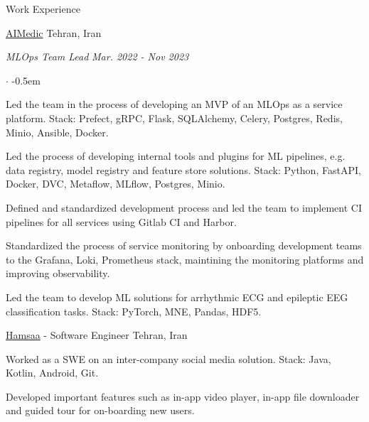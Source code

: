 \documentclass[../professional-cv.tex]{subfiles}
\begin{document}
\begin{rSection}{Work Experience}
	\begin{rWorkSection}
		{\href{https://aimedic.co/}{AIMedic}}
		{Tehran, Iran}

		\vspace{-1em}
		{\em MLOps Team Lead} \hfill {\em Mar. 2022 - Nov 2023} \hspace{10pt}
		\normalfont
		\begin{list}{$\cdot$}{\leftmargin=10pt\normalfont \rightmargin=20pt}
			\itemsep -0.5em
			\item Led the team in the process of developing an MVP of an MLOps as a service platform. Stack: Prefect, gRPC, Flask, SQLAlchemy, Celery, Postgres, Redis, Minio, Ansible, Docker.
			\item Led the process of developing internal tools and plugins for ML pipelines, e.g. data registry, model registry and feature store solutions. Stack: Python, FastAPI, Docker, DVC, Metaflow, MLflow, Postgres, Minio.
			\item Defined and standardized development process and led the team to implement CI pipelines for all services using Gitlab CI and Harbor.
			\item Standardized the process of service monitoring by onboarding development teams to the Grafana, Loki, Prometheus stack, maintining the monitoring platforms and improving observability.
			\item Led the team to develop ML solutions for arrhythmic ECG and epileptic EEG classification tasks. Stack: PyTorch, MNE, Pandas, HDF5.
		\end{list}
	\end{rWorkSection}

	\begin{rSubsection}
		{\href{https://hamsaa.ir}{Hamsaa}}
		{  -  }
		{Software Engineer}
		{Tehran, Iran}
		\item Worked as a SWE on an inter-company social media solution. Stack: Java, Kotlin, Android, Git.
		\item Developed important features such as in-app video player, in-app file downloader and guided tour for on-boarding new users.

	\end{rSubsection}



\end{rSection}
\end{document}
